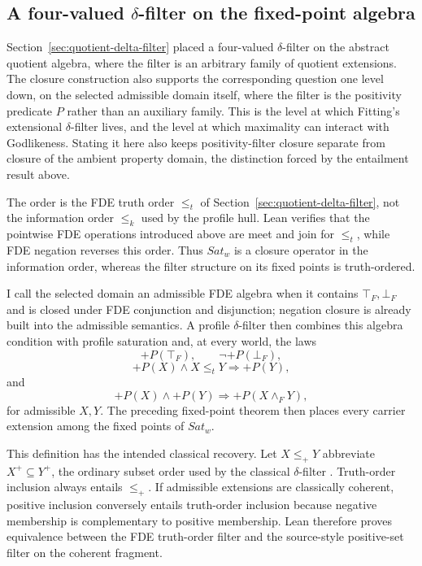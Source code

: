 \subsection{A four-valued \texorpdfstring{$\delta$}{delta}-filter on the fixed-point algebra}
\label{sec:fitting-delta-filter}

Section~\ref{sec:quotient-delta-filter} placed a four-valued \(\delta\)-filter on the abstract quotient algebra, where the filter is an arbitrary family of quotient extensions. The closure construction also supports the corresponding question one level down, on the selected admissible domain itself, where the filter is the positivity predicate \(P\) rather than an auxiliary family. This is the level at which Fitting's extensional \(\delta\)-filter lives, and the level at which maximality can interact with Godlikeness. Stating it here also keeps positivity-filter closure separate from closure of the ambient property domain, the distinction forced by the entailment result above.

The order is the FDE truth order \(\leq_t\) of Section~\ref{sec:quotient-delta-filter}, not the information order \(\leq_k\) used by the profile hull. Lean verifies that the pointwise FDE operations introduced above are meet and join for \(\leq_t\), while FDE negation reverses this order. Thus \(Sat_w\) is a closure operator in the information order, whereas the filter structure on its fixed points is truth-ordered.

I call the selected domain an admissible FDE algebra when it contains \(\top_F,\bot_F\) and is closed under FDE conjunction and disjunction; negation closure is already built into the admissible semantics. A profile \(\delta\)-filter then combines this algebra condition with profile saturation and, at every world, the laws
\[
  +P(\top_F),
  \qquad
  \neg +P(\bot_F),
\]
\[
  +P(X)\land X\leq_tY\Longrightarrow +P(Y),
\]
and
\[
  +P(X)\land +P(Y)\Longrightarrow +P(X\wedge_FY),
\]
for admissible \(X,Y\). The preceding fixed-point theorem then places every carrier extension among the fixed points of \(Sat_w\).

This definition has the intended classical recovery. Let \(X\leq_+Y\) abbreviate \(X^{+}\subseteq Y^{+}\), the ordinary subset order used by the classical \(\delta\)-filter
\cite{BenzmuellerFuenmayor2019}. Truth-order inclusion always entails \(\leq_+\). If admissible extensions are classically coherent, positive inclusion conversely entails truth-order inclusion because negative membership is complementary to positive membership. Lean therefore proves equivalence between the FDE truth-order filter and the source-style positive-set filter on the coherent fragment.

